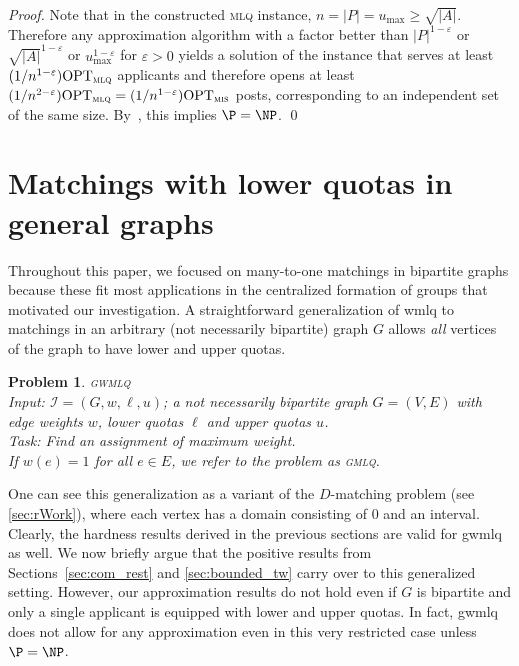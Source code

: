 \documentclass{llncs}
\newtheorem{pr}[theorem]{Problem}
\newcommand{\OPT}{\textup{OPT}}
\begin{document}
\begin{proof}
	Note that in the constructed \textsc{mlq} instance, $n =|P| = u_{\max} \geq \sqrt{|A|}$. Therefore any approximation algorithm with a factor better than $|P|^{1-\varepsilon}$ or $\sqrt{|A|}^{1-\varepsilon}$ or $u_{\max}^{1-\varepsilon}$ for $\varepsilon > 0$ yields a solution of the instance that serves at least~$(1/n^{1-\varepsilon}) \OPT_{\textsc{mlq}}$ applicants and therefore opens at least $(1/n^{2-\varepsilon}) \OPT_{\textsc{mlq}} = (1/n^{1 - \varepsilon}) \OPT_{\textsc{mis}}$ posts, corresponding to an independent set of the same size. By~\cite{Zuc07}, this implies $\P = \NP$. \qed
\end{proof}

\section{Matchings with lower quotas in general graphs}
\label{sec:many}

Throughout this paper, we focused on many-to-one matchings in bipartite graphs because these fit most applications in the centralized formation of groups that motivated our investigation. A straightforward generalization of {\sc wmlq} to matchings in an arbitrary (not necessarily bipartite) graph $G$ allows \textit{all} vertices of the graph to have lower and upper quotas. 

\begin{pr} \textsc{gwmlq}\ \\
	Input: $\mathcal{I} = (G, w, \ell, u)$; a not necessarily bipartite graph $G = (V, E)$ with edge weights $w$, lower quotas $\ell$ and upper quotas $u$.\\
Task: Find an assignment of maximum weight.\\
If $w(e)=1$ for all $e \in E$, we refer to the problem as \textsc{gmlq}.
\end{pr}

One can see this generalization as a variant of the $D$-matching problem (see \cref{sec:rWork}), where each vertex has a domain consisting of 0 and an interval. Clearly, the hardness results derived in the previous sections are valid for {\sc gwmlq} as well. We now briefly argue that the positive results from Sections~\ref{sec:com_rest} and \ref{sec:bounded_tw} carry over to this generalized setting. However, our approximation results do not hold even if $G$ is bipartite and only a single applicant is equipped with lower and upper quotas. In fact, {\sc gwmlq} does not allow for any approximation even in this very restricted case unless $\P=\NP$.
\smallskip
\end{document}
